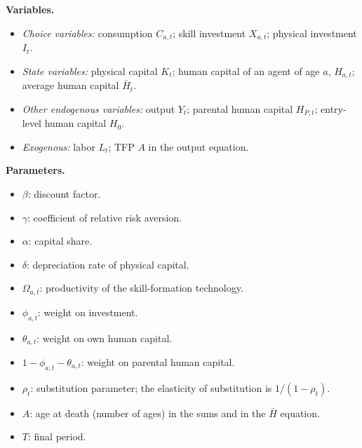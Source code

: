 \documentclass{article}
\begin{document}
\medskip
\noindent\textbf{Variables.}
\begin{itemize}
    \item \emph{Choice variables:} consumption $C_{a,t}$; skill investment $X_{a,t}$; physical investment $I_t$.
    \item \emph{State variables:} physical capital $K_t$; human capital of an agent of age $a$, $H_{a,t}$; average human capital $\bar{H}_t$.
    \item \emph{Other endogenous variables:} output $Y_t$; parental human capital $H_{P,t}$; entry-level human capital $H_0$.
    \item \emph{Exogenous:} labor $L_t$; TFP $A$ in the output equation.
\end{itemize}

\noindent\textbf{Parameters.}
\begin{itemize}
    \item $\beta$: discount factor.
    \item $\gamma$: coefficient of relative risk aversion.
    \item $\alpha$: capital share.
    \item $\delta$: depreciation rate of physical capital.
    \item $\Omega_{a,t}$: productivity of the skill-formation technology.
    \item $\phi_{a,t}$: weight on investment.
    \item $\theta_{a,t}$: weight on own human capital.
    \item $1-\phi_{a,t}-\theta_{a,t}$: weight on parental human capital.
    \item $\rho_t$: substitution parameter; the elasticity of substitution is $1/(1-\rho_t)$.
    \item $A$: age at death (number of ages) in the sums and in the $\bar{H}$ equation.
    \item $T$: final period.
\end{itemize}
\end{document}
